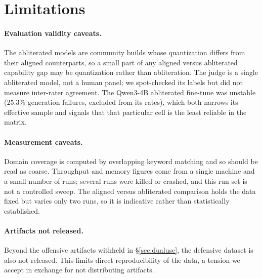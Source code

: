 \section{Limitations}
\label{sec:limitations}

\paragraph{Evaluation validity caveats.}
The abliterated models are community builds whose quantization
differs from their aligned counterparts, so a small part of any aligned versus abliterated capability gap may be quantization rather than abliteration. The
judge is a single abliterated model, not a human panel; we spot-checked its
labels but did not measure inter-rater agreement. The Qwen3-4B abliterated fine-tune was unstable
($25.3\%$ generation failures, excluded from its rates), which both narrows its
effective sample and signals that that particular cell is the least reliable in
the matrix.

\paragraph{Measurement caveats.}
Domain coverage is computed by overlapping keyword matching and so should be
read as coarse. Throughput and memory figures come from a single machine and a
small number of runs; several runs were killed or crashed, and this run set is
not a controlled sweep. The aligned versus abliterated comparison holds
the data fixed but varies only two runs, so it is indicative rather than
statistically established.

\paragraph{Artifacts not released.}
Beyond the offensive artifacts withheld in \S\ref{sec:dualuse}, the defensive
dataset is also not released. This
limits direct reproducibility of the data, a tension we accept in exchange for
not distributing artifacts.
